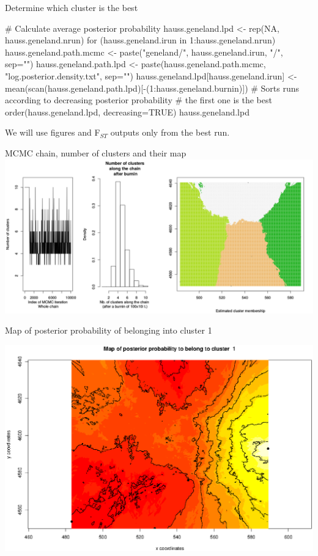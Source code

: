 \documentclass[compress, ucs, xelatex, 11pt, xcolor=svgnames,
  hyperref={
    bookmarks=true,
    unicode=true,
    colorlinks=true,
    pdftitle={Molecular data in R},
    plainpages=false,
    pdfauthor={Vojtech Zeisek},
    pdfsubject={Course about phylogeny and evolution in R},
    pdfcreator={XeLaTeX},
    pdfkeywords={R, evolution, phylogeny, molecular data},
    linkcolor=Tomato,
    anchorcolor=SaddleBrown,
    citecolor=Goldenrod,
    filecolor=DarkMagenta,
    menucolor=Sienna,
    urlcolor=DarkTurquoise,
    pdftex},
  url={hyphens, lowtilde} %
  ]{beamer}
\begin{document}
\begin{frame}[fragile]{Determine which cluster is the best}
  \begin{spluscode}
    # Calculate average posterior probability
    hauss.geneland.lpd <- rep(NA, hauss.geneland.nrun)
    for (hauss.geneland.irun in 1:hauss.geneland.nrun) {
      hauss.geneland.path.mcmc <- paste("geneland/",
        hauss.geneland.irun, "/", sep="")
      hauss.geneland.path.lpd <- paste(hauss.geneland.path.mcmc,
        "log.posterior.density.txt", sep="")
      hauss.geneland.lpd[hauss.geneland.irun] <- 
        mean(scan(hauss.geneland.path.lpd)[-(1:hauss.geneland.burnin)])
      }
    # Sorts runs according to decreasing posterior probability
    # the first one is the best
    order(hauss.geneland.lpd, decreasing=TRUE)
    hauss.geneland.lpd
  \end{spluscode}
\vfil
We will use figures and F$_{ST}$ outputs only from the best run.
\end{frame}

\begin{frame}{MCMC chain, number of clusters and their map}
\includegraphics[width=\textwidth]{geneland1.png}
\end{frame}

\begin{frame}{Map of posterior probability of belonging into cluster 1}
\begin{center}
  \includegraphics[width=\textwidth-1.5cm]{geneland2.png}
\end{center}
\end{frame}
\end{document}
